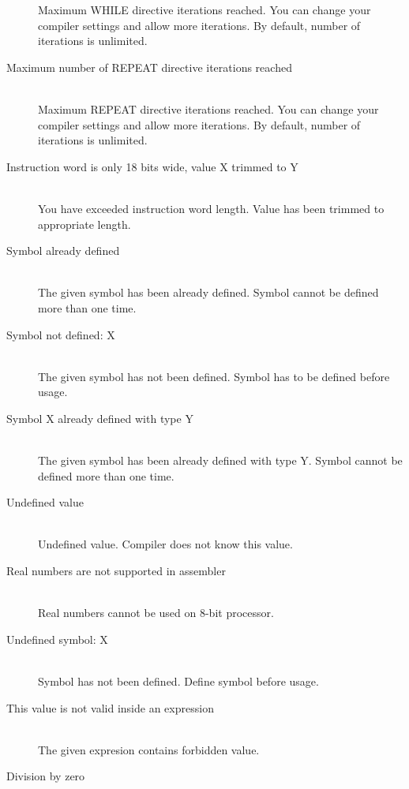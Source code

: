 \begin{description}
                    Maximum WHILE directive iterations reached. You can change your compiler settings and allow more iterations.
                    By default, number of iterations is unlimited.
                    \item[Maximum number of REPEAT directive iterations reached ] \hfill \\                     %
                    Maximum REPEAT directive iterations reached. You can change your compiler settings and allow more iterations.
                    By default, number of iterations is unlimited.
                    \item[Instruction word is only 18 bits wide, value X trimmed to Y ] \hfill \\
                    You have exceeded instruction word length. Value has been trimmed to  appropriate length.
                    \item[Symbol already defined] \hfill \\
                    The given symbol has been already defined. Symbol cannot be defined more than one time.
                    \item[Symbol not defined: X ] \hfill \\
                    The given symbol has not been defined. Symbol has to be defined before usage.
                    \item[Symbol X already defined with type Y] \hfill \\
                    The given symbol has been already defined with type Y. Symbol cannot be defined more than one time.
                    \item[Undefined value ] \hfill \\
                    Undefined value. Compiler does not know this value.                       %
                    \item[Real numbers are not supported in assembler ] \hfill \\
                    Real numbers cannot be used on 8-bit processor.
                    \item[Undefined symbol: X ] \hfill \\
                    Symbol has not been defined. Define symbol before usage.
                    \item[This value is not valid inside an expression ] \hfill \\         %
                    The given expresion contains forbidden value.
                    \item[Division by zero ] \hfill \\

\end{description}
